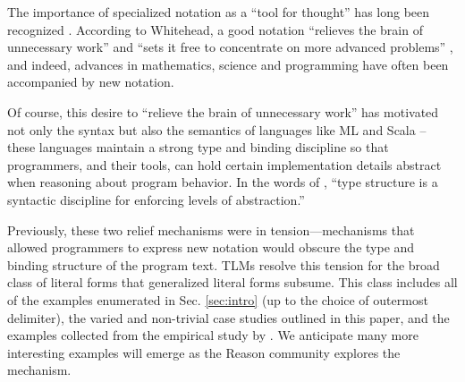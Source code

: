 \documentclass[acmsmall]{acmart}
\begin{document}
The importance of specialized notation as a ``tool for thought'' has long been recognized \cite{DBLP:journals/cacm/Iverson80}. According to Whitehead, a good notation ``relieves the brain of unnecessary work'' and ``sets it free to concentrate on more advanced problems'' \cite{cajori1928history}, and indeed, advances in mathematics, science and programming have often been accompanied by new notation. 

Of course, this desire to ``relieve the brain of unnecessary work'' has motivated not only the syntax but also the semantics of languages like ML and Scala -- these languages maintain a strong type and binding discipline so that programmers, and their tools, can hold certain implementation details abstract when reasoning about program behavior.  In the words of \citet{B304}, ``type structure is a syntactic discipline for enforcing levels of abstraction.''

Previously, these two relief mechanisms were in tension---mechanisms  that allowed programmers to express new notation would obscure the type and binding structure of the program text. TLMs resolve this tension for the broad class of literal forms that generalized literal forms subsume. This class includes all of the examples enumerated in Sec. \ref{sec:intro} (up to the choice of outermost delimiter), the varied and non-trivial case studies outlined in this paper, and the examples collected from the empirical study by \citet{TSLs}. We anticipate many more interesting examples will emerge as the Reason community explores the mechanism.
\end{document}
